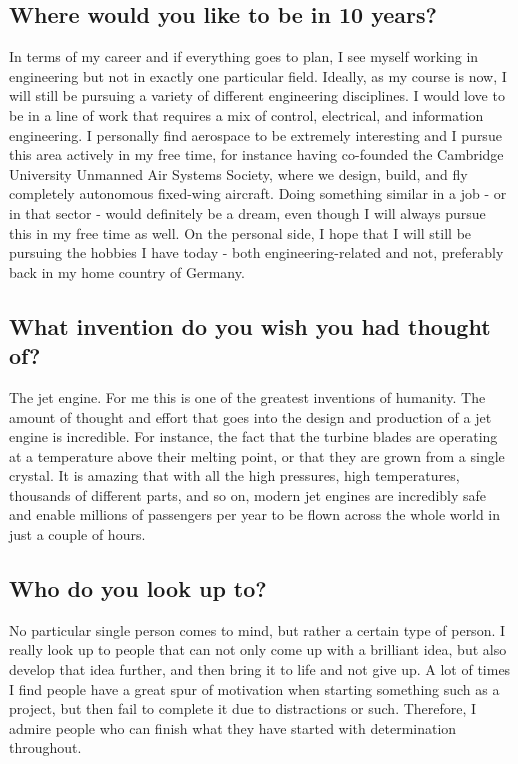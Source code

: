 \documentclass[]{article}
\begin{document}
\subsection{Where would you like to be in 10 years?}

In terms of my career and if everything goes to plan, I see myself working in engineering but not in exactly one particular field. Ideally, as my course is now, I will still be pursuing a variety of different engineering disciplines. I would love to be in a line of work that requires a mix of control, electrical, and information engineering. I personally find aerospace to be extremely interesting and I pursue this area actively in my free time, for instance having co-founded the Cambridge 	University Unmanned Air Systems Society, where we design, build, and fly completely autonomous fixed-wing aircraft. Doing something similar in a job - or in that sector - would definitely be a dream, even though I will always pursue this 	in my free time as well. On the personal side, I hope that I will still be pursuing the hobbies I have today - both engineering-related and not, preferably back in my home country of Germany.

\subsection{What invention do you wish you had thought of?}

The jet engine. For me this is one of the greatest inventions of humanity. The amount of thought and effort that goes into the design and production of a jet engine is incredible. For instance, the fact that the turbine blades are operating at a temperature above their melting point, or that they are grown from a single crystal. It is amazing that with all the high pressures, high temperatures, thousands of different parts, and so on, modern jet engines are incredibly safe and enable millions of passengers per year to be flown across the whole world in just a couple of hours.

\subsection{Who do you look up to?}

No particular single person comes to mind, but rather a certain type of person. I	really look up to people that can not only come up with a brilliant idea, but also develop that idea further, and then bring it to life and not give up. A lot of times I find people have a great spur of motivation when starting something such as a project, but then fail to complete it due to distractions or such. Therefore, I admire people who can finish what they have started with determination throughout.
\end{document}
